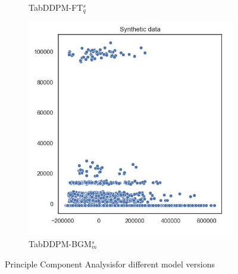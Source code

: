 \begin{figure}[h]
\begin{subfigure}{0.3\textwidth}
		\caption{TabDDPM-FT$^{s}_q$}
    \end{subfigure}
	\begin{subfigure}{0.3\textwidth}
		\includegraphics[width=\textwidth]{images/pca/tab-ddpm-bgm-simTune-minmax.jpg}
		\caption{TabDDPM-BGM$^{s}_m$}
		\label{fig_a:pca_TabDDPMBM}
    \end{subfigure}
    \caption{Principle Component Analysisfor different model versions}
    \label{fig_a:pca_diff}
\end{figure}



